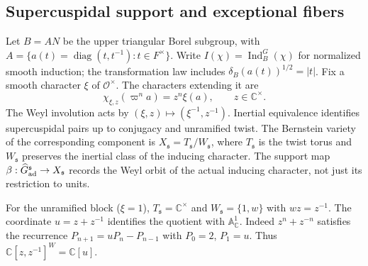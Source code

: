 \subsection{Supercuspidal support and exceptional fibers}\label{subsec:exceptional-fibers}
Let $B=AN$ be the upper triangular Borel subgroup, with $A=\{a(t)=\operatorname{diag}(t,t^{-1}):t\in F^\times\}$. Write $I(\chi)=\operatorname{Ind}_B^G(\chi)$ for normalized smooth induction; the transformation law includes $\delta_B(a(t))^{1/2}=|t|$. Fix a smooth character $\xi$ of $\mathcal O^\times$. The characters extending it are
\[\chi_{\xi,z}(\varpi^n a)=z^n\xi(a),\qquad z\in\mathbb C^\times.\]
The Weyl involution acts by $(\xi,z)\mapsto(\xi^{-1},z^{-1})$. Inertial equivalence identifies supercuspidal pairs up to conjugacy and unramified twist. The Bernstein variety of the corresponding component is $X_{\mathfrak s}=T_{\mathfrak s}/W_{\mathfrak s}$, where $T_{\mathfrak s}$ is the twist torus and $W_{\mathfrak s}$ preserves the inertial class of the inducing character. The support map $\beta:\widehat G_{\rm ad}^{\mathfrak s}\to X_{\mathfrak s}$ records the Weyl orbit of the actual inducing character, not just its restriction to units.

For the unramified block ($\xi=1$), $T_{\mathfrak s}=\mathbb C^\times$ and $W_{\mathfrak s}=\{1,w\}$ with $wz=z^{-1}$. The coordinate $u=z+z^{-1}$ identifies the quotient with $\mathbb A^1_{\mathbb C}$. Indeed $z^n+z^{-n}$ satisfies the recurrence $P_{n+1}=uP_n-P_{n-1}$ with $P_0=2$, $P_1=u$. Thus $\mathbb C[z,z^{-1}]^W=\mathbb C[u]$.


